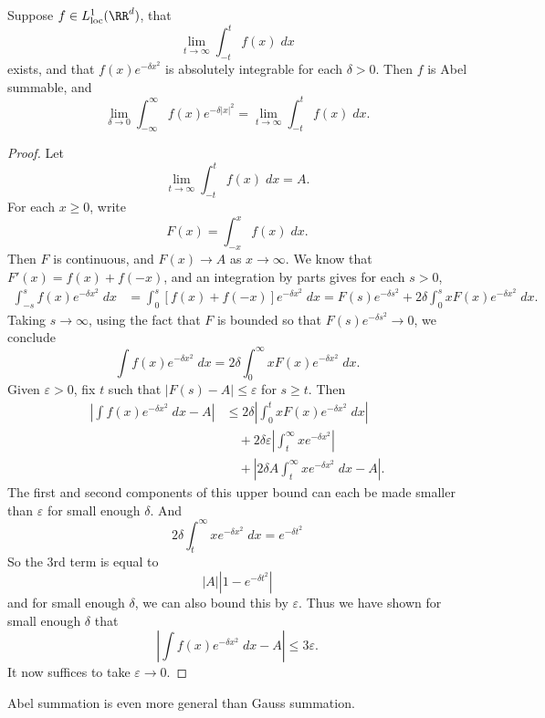 \begin{lemma}
	Suppose $f \in L^1_{\text{loc}}(\RR^d)$, that
	\[ \lim_{t \to \infty} \int_{-t}^t f(x)\; dx \]
	exists, and that $f(x) e^{-\delta x^2}$ is absolutely integrable for each $\delta > 0$. Then $f$ is Abel summable, and
	\[ \lim_{\delta \to 0} \int_{-\infty}^\infty f(x) e^{-\delta |x|^2} = \lim_{t \to \infty} \int_{-t}^t f(x)\; dx. \]
\end{lemma}
\begin{proof}
	Let
	\[ \lim_{t \to \infty} \int_{-t}^t f(x)\; dx = A. \]
	For each $x \geq 0$, write
	\[ F(x) = \int_{-x}^x f(x)\; dx. \]
	Then $F$ is continuous, and $F(x) \to A$ as $x \to \infty$. We know that $F'(x) = f(x) + f(-x)$, and an integration by parts gives for each $s > 0$,
	\begin{align*}
		\int_{-s}^s f(x) e^{-\delta x^2}\; dx &= \int_0^s [f(x) + f(-x)] e^{-\delta x^2}\; dx = F(s) e^{-\delta s^2} + 2 \delta \int_0^s x F(x) e^{-\delta x^2}\; dx.
	\end{align*}
	Taking $s \to \infty$, using the fact that $F$ is bounded so that $F(s) e^{-\delta s^2} \to 0$, we conclude
	\[ \int f(x) e^{-\delta x^2}\; dx = 2 \delta \int_0^\infty x F(x) e^{-\delta x^2}\; dx. \]
	Given $\varepsilon > 0$, fix $t$ such that $|F(s) - A| \leq \varepsilon$ for $s \geq t$. Then
	\begin{align*}
		\left| \int f(x) e^{-\delta x^2}\; dx - A \right| &\leq 2 \delta \left| \int_0^t x F(x) e^{-\delta x^2}\; dx \right|\\
		&\quad + 2 \delta \varepsilon \left| \int_t^\infty x e^{-\delta x^2} \right|\\
		&\quad + \left| 2 \delta A \int_t^\infty x e^{-\delta x^2}\; dx - A \right|.
	\end{align*}
	The first and second components of this upper bound can each be made smaller than $\varepsilon$ for small enough $\delta$. And
	\[ 2 \delta \int_t^\infty x e^{-\delta x^2}\; dx = e^{-\delta t^2} \]
	So the 3rd term is equal to
	\[ |A| |1 - e^{-\delta t^2}| \]
	and for small enough $\delta$, we can also bound this by $\varepsilon$. Thus we have shown for small enough $\delta$ that
	\[ \left| \int f(x) e^{-\delta x^2}\; dx - A \right| \leq 3 \varepsilon. \]
	It now suffices to take $\varepsilon \to 0$.
\end{proof}

Abel summation is even more general than Gauss summation.

